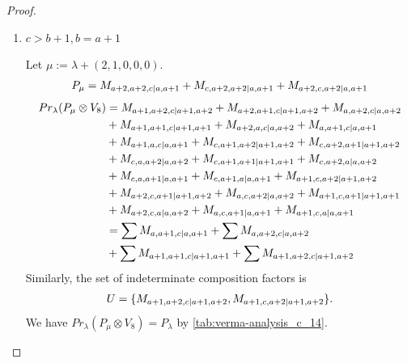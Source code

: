 \begin{proof}
\begin{enumerate}
\begin{enumerate}
        \item $c>b+1,b=a+1$ \par
        Let $\mu:=\lambda + (2,1,0,0,0) $.
        \begin{equation}\notag
          \begin{aligned}
            P_\mu = M_{a+2,a+2,c|a,a+1}
+ M_{c,a+2,a+2|a,a+1}
+ M_{a+2,c,a+2|a,a+1}
          \end{aligned}
        \end{equation}
        \begin{equation}\notag
          \begin{aligned}
            Pr_{\lambda}(P_\mu \otimes V_{8}) &=
M_{a+1,a+2,c|a+1,a+2}
+ M_{a+2,a+1,c|a+1,a+2}
+ M_{a,a+2,c|a,a+2}\\
                                              &
+ M_{a+1,a+1,c|a+1,a+1}
+ M_{a+2,a,c|a,a+2}
+ M_{a,a+1,c|a,a+1}\\
                                              &
+ M_{a+1,a,c|a,a+1}
+ M_{c,a+1,a+2|a+1,a+2}
+ M_{c,a+2,a+1|a+1,a+2}\\
                                              &
+ M_{c,a,a+2|a,a+2}
+ M_{c,a+1,a+1|a+1,a+1}
+ M_{c,a+2,a|a,a+2}\\
                                              &
+ M_{c,a,a+1|a,a+1}
+ M_{c,a+1,a|a,a+1}
+ M_{a+1,c,a+2|a+1,a+2}\\
                                              &
+ M_{a+2,c,a+1|a+1,a+2}
+ M_{a,c,a+2|a,a+2}
+ M_{a+1,c,a+1|a+1,a+1}\\
                                              &
+ M_{a+2,c,a|a,a+2}
+ M_{a,c,a+1|a,a+1}
+ M_{a+1,c,a|a,a+1} \\
                                               &=
\sum M_{a,a+1,c|a,a+1}
+ \sum M_{a,a+2,c|a,a+2}\\
                                              &
+ \sum M_{a+1,a+1,c|a+1,a+1}
+ \sum M_{a+1,a+2,c|a+1,a+2}
          \end{aligned}
        \end{equation}
      Similarly, the set of indeterminate composition factors is 
\begin{equation}\notag
  \begin{aligned}
    U = \{
M_{a+1,a+2,c|a+1,a+2},
M_{a+1,c,a+2|a+1,a+2}
\}.
  \end{aligned}
\end{equation}
       We have $Pr_{\lambda}(P_\mu \otimes V_{8}) = P_\lambda  $ by \cref{tab:verma-analysis_c_14}.
\begin{table}[htbp]

\end{table}
\end{enumerate}
\end{enumerate}
\end{proof}
